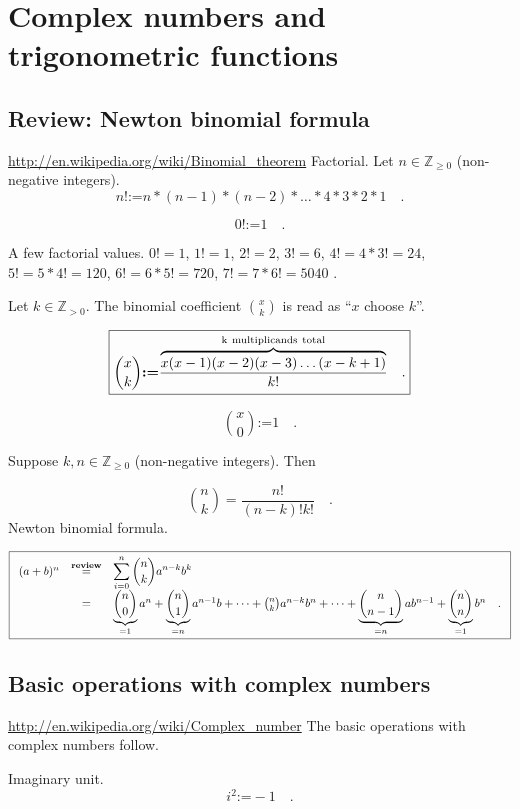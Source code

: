\documentclass[12pt]{book}
\newcommand{\eqdef}{\textbf{:=}}
\newcommand{\eqReview}{\stackrel{\textbf{review}}{=}}
\newcommand{\importantFormula}[1]{\begin{equation} \boxed{#1} \end{equation}}
\begin{document}
\section{Complex numbers and trigonometric functions}
\subsection{Review: Newton binomial formula}\label{secNewtonBinomialReview}
\url{http://en.wikipedia.org/wiki/Binomial_theorem}
 Factorial. Let $n\in \mathbb Z_{\geq 0}$ (non-negative integers).
\[
n!\eqdef n*(n-1)*(n-2)*\dots *4*3*2*1 \quad  .
\]

\[0!\eqdef 1  \quad .
\]

A few factorial values. $0!=1$, $1!=1$, $2!=2$, $3!=6$, $4!=4*3!=24$, $5!=5*4!=120$, $6!=6*5!=720$, $7!=7*6!=5040$  \quad .

 Let $k\in \mathbb Z_{>0}$. The binomial coefficient $\binom{x}{k}$ is read as ``$x$ choose $k$''.

\importantFormula{\label{eqBinomialCoeffDefinition}
\binom{x}{k}\eqdef \frac{ \overbrace{ x(x-1)(x-2)(x-3)\dots (x-k+1)}^{\mathrm{k~multiplicands~total}} } {k!} \quad .
}

\[\binom{x}{0}\eqdef 1 \quad .
\]

Suppose $k,n\in \mathbb Z_{\geq 0}$ (non-negative integers). Then

\[\binom{n}{k} = \frac{n!}{(n-k)! k!}\quad .
\]
 Newton binomial formula.

\importantFormula{\label{eqNewtonBinomialFormula}
\begin{array}{rcl}
(a+b)^{n} &\eqReview&\displaystyle \sum\limits_{i=0}^n \binom {n}{k} a^{n-k}b^{k} \\&=& \underbrace{\binom{n}{0}}_{=1} a^n + \underbrace{\binom{n}{1}}_{=n}a^{n-1}b +\dots+ \binom{n}{k}a^{n-k}b^{n}+\dots + \underbrace{\binom{n}{n-1}}_{=n}ab^{n-1} + \underbrace{\binom{n}{n}}_{=1} b^n \quad .
\end{array}
}

\subsection{Basic operations with complex numbers}\label{secComplexNumbers}

\noindent \url{http://en.wikipedia.org/wiki/Complex_number}
\noindent The basic operations with complex numbers follow.

 Imaginary unit.
\[i^2\eqdef -1\quad .\]
\end{document}
